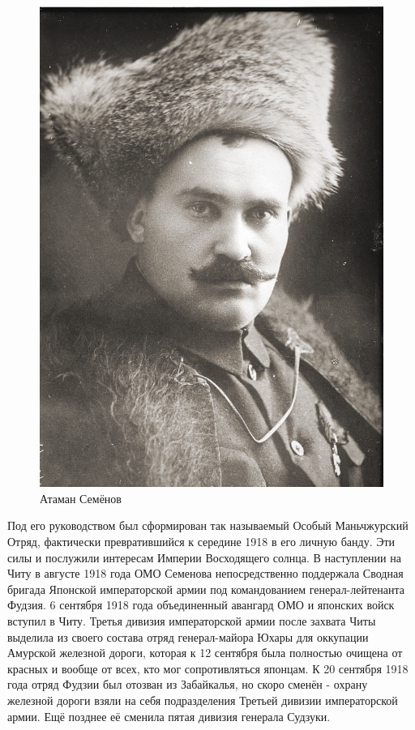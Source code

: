 \begin{figure}[h!tb] 
	\centering\includegraphics[scale=0.4]{Glava5/H-CriBMSs0Y.jpg}
	\caption{Атаман Семёнов}%
\end{figure}

Под его руководством был сформирован так называемый Особый Маньчжурский Отряд, фактически превратившийся к середине 1918 в его личную банду. Эти силы и послужили интересам Империи Восходящего солнца. В наступлении на Читу в августе 1918 года ОМО Семенова непосредственно поддержала Сводная бригада Японской императорской армии под командованием генерал-лейтенанта Фудзия. 6 сентября 1918 года объединенный авангард ОМО и японских войск вступил в Читу. Третья дивизия императорской армии после захвата Читы выделила из своего состава отряд генерал-майора Юхары для оккупации Амурской железной дороги, которая к 12 сентября была полностью очищена от красных и вообще от всех, кто мог сопротивляться японцам. К 20 сентября 1918 года отряд Фудзии был отозван из Забайкалья, но скоро сменён - охрану железной дороги взяли на себя подразделения Третьей дивизии императорской армии. Ещё позднее её сменила пятая дивизия генерала Судзуки.

